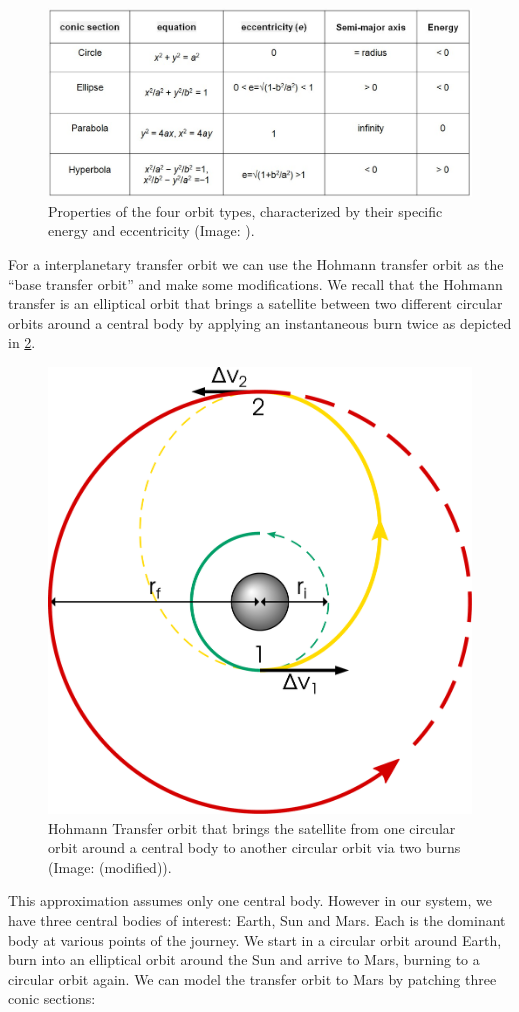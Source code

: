 \begin{figure}[ht]
    \centering
    \includegraphics[width=0.80\linewidth]{fig/orbit-type-properties.jpg}
    \caption{Properties of the four orbit types, characterized by their specific energy and eccentricity (Image: \cite{RaianoMichele}).}
    \label{fig:orbit-type-properties}
\end{figure} 

For a interplanetary transfer orbit we can use the Hohmann transfer orbit as the ``base transfer orbit'' and make some modifications. We recall that the Hohmann transfer is an elliptical orbit that brings a satellite between two different circular orbits around a central body by applying an instantaneous burn twice as depicted in \cref{fig:hohmann}.

\begin{figure}[ht]
    \centering
    \includegraphics[width=0.4\linewidth]{fig/hohmann.pdf}
    \caption{Hohmann Transfer orbit that brings the satellite from one circular orbit around a central body to another circular orbit via two burns (Image: \cite{Leafnode} (modified)).}
    \label{fig:hohmann}
    \end{figure}

This approximation assumes only one central body. However in our system, we have three central bodies of interest: Earth, Sun and Mars. Each is the dominant body at various points of the journey. We start in a circular orbit around Earth, burn into an elliptical orbit around the Sun and arrive to Mars, burning to a circular orbit again. We can model the transfer orbit to Mars by patching three conic sections:

